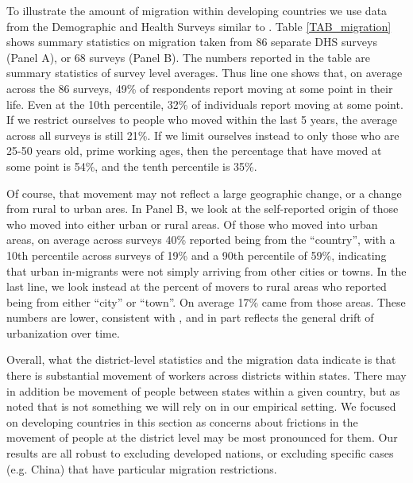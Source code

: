 \documentclass[11pt]{article}
\begin{document}
To illustrate the amount of migration within developing countries we use data from the Demographic and Health Surveys \citep{DHS} similar to \cite{young2013inequality}. Table \ref{TAB_migration} shows summary statistics on migration taken from 86 separate DHS surveys (Panel A), or 68 surveys (Panel B). The numbers reported in the table are summary statistics of survey level averages. Thus line one shows that, on average across the 86 surveys, 49\% of respondents report moving at some point in their life. Even at the 10th percentile, 32\% of individuals report moving at some point. If we restrict ourselves to people who moved within the last 5 years, the average across all surveys is still 21\%. If we limit ourselves instead to only those who are 25-50 years old, prime working ages, then the percentage that have moved at some point is 54\%, and the tenth percentile is 35\%.

Of course, that movement may not reflect a large geographic change, or a change from rural to urban ares. In Panel B, we look at the self-reported origin of those who moved into either urban or rural areas. Of those who moved into urban areas, on average across surveys 40\% reported being from the ``country'', with a 10th percentile across surveys of 19\% and a 90th percentile of 59\%, indicating that urban in-migrants were not simply arriving from other cities or towns. In the last line, we look instead at the percent of movers to rural areas who reported being from either ``city'' or ``town''. On average 17\% came from those areas. These numbers are lower, consistent with \cite{young2013inequality}, and in part reflects the general drift of urbanization over time.

Overall, what the district-level statistics and the migration data indicate is that there is substantial movement of workers across districts within states. There may in addition be movement of people between states within a given country, but as noted that is not something we will rely on in our empirical setting. We focused on developing countries in this section as concerns about frictions in the movement of people at the district level may be most pronounced for them. Our results are all robust to excluding developed nations, or excluding specific cases (e.g. China) that have particular migration restrictions.
\end{document}
